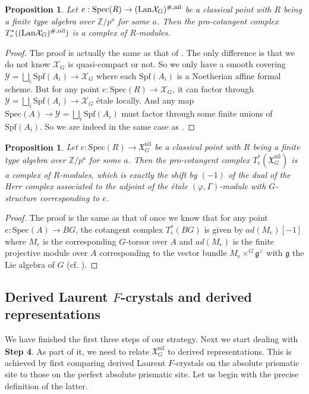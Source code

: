 \documentclass[10pt]{article}
\newtheorem{prop}[thm]{Proposition}
\numberwithin{equation}{section}
\newcommand{\frakg}{{\mathfrak g}}
\newcommand{\frakX}{{\mathfrak X}}
\newcommand{\bZ}{{\mathbb Z}}
\newcommand{\calX}{{\mathcal X}}
\newcommand{\calY}{{\mathcal Y}}
\newcommand{\Lan}{{\mathrm{Lan}}}
\newcommand{\nil}{\mathrm{nil}}
\newcommand{\Spf}{{\mathrm{Spf}}}           %
\newcommand{\Spec}{{\mathrm{Spec}}}         %
\begin{document}
\begin{prop}\label{cot-1}
    Let $e:\Spec(R)\to (\Lan\calX_G)^{\#,\rm nil}$ be a classical point with $R$ being a finite type algebra over $\bZ/p^a$ for some $a$. Then the pro-cotangent complex $T^*_{e}((\Lan\calX_G)^{\#,\rm nil})$ is a complex of $R$-modules.
\end{prop}
\begin{proof}
    The proof is actually the same as that of \cite[Proposition 3.38]{Min23}. The only difference is that we do not know $\calX_G$ is quasi-compact or not. So we only have a smooth covering $\calY=\bigsqcup_i\Spf(A_i)\to \calX_G$ where each $\Spf(A_i)$ is a Noetherian affine formal scheme. But for any point $e:\Spec(R)\to \calX_G$, it can factor through $\calY=\bigsqcup_i\Spf(A_i)\to \calX_G$ \'etale locally. And any map $\Spec(A)\to \calY=\bigsqcup_i\Spf(A_i)$ must factor through some finite unions of $\Spf(A_i)$. So we are indeed in the same case as \cite[Proposition 3.38]{Min23}.
\end{proof}



\begin{prop}\label{cot-2}
 Let $e:\Spec(R)\to \frakX_G^{\nil}$ be a classical point with $R$ being a finite type algebra over $\bZ/p^a$ for some $a$. Then the pro-cotangent complex $T^*_{e}(\frakX_G^{\nil})$ is a complex of $R$-modules, which is exactly the shift by $(-1)$ of the dual of the Herr complex associated to the adjoint of the \'etale $(\varphi,\Gamma)$-module with $G$-structure corresponding to $e$.
\end{prop}
\begin{proof}
    The proof is the same as that of \cite[Proposition 3.40]{Min23} once we know that for any point $e:\Spec(A)\to BG$, the cotangent complex $T^*_e(BG)$ is given by $ad(M_e)[-1]$ where $M_e$ is the corresponding $G$-torsor over $A$ and $ad(M_e)$ is the finite projective module over $A$ corresponding to the vector bundle $ M_e\times^G\frakg^\vee$ with $\frakg$ the Lie algebra of $G$ (cf. \cite[Section 2.4]{Khan24}).
\end{proof}

\subsection{Derived Laurent $F$-crystals and derived representations}
We have finished the first three steps of our strategy. Next we start dealing with \textbf{Step 4}. As part of it, we need to relate $\frakX_G^{\nil}$ to derived representations. This is achieved by first comparing derived Laurent $F$-crystals on the absolute prismatic site to those on the perfect absolute prismatic site. Let us begin with the precise definition of the latter.
\end{document}
